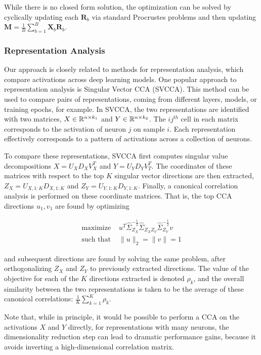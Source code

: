 While there is no closed form solution, the optimization can be solved by cyclically updating each $\mathbf{R}_{b}$ via standard Procrustes problems and then updating $\mathbf{M} = \frac{1}{B} \sum_{b = 1}^{B} \mathbf{X}_{b} \mathbf{R}_{b}$.

\subsubsection{Representation Analysis}

Our approach is closely related to methods for representation analysis, which
compare activations across deep learning models. One popular approach to
representation analysis is Singular Vector CCA (SVCCA). This method can be used
to compare pairs of representations, coming from different layers, models, or
training epochs, for example. In SVCCA, the two representations are identified
with two matrices, $X \in \mathbb{R}^{n \times k_{1}}$ and $Y \in \mathbb{R}^{n \times
  k_{2}}$. The $ij^{th}$ cell in each matrix corresponds to the activation of
neuron $j$ on sample $i$. Each representation effectively corresponds to a
pattern of activations across a collection of neurons.

To compare these representations, SVCCA first computes singular value
decompositions $X = U_{X}D_{X}V_{X}^{T}$ and $Y = U_{Y}D_{Y}V_{T}^{T}$. The
coordinates of these matrices with respect to the top $K$ singular vector
directions are then extracted, $Z_{X} = U_{X, 1:K}D_{X, 1:K}$ and $Z_{Y} = U_{Y,
  1:K}D_{Y, 1:K}$. Finally, a canonical correlation analysis is performed on
these coordinate matrices. That is, the top CCA directions $u_{1}, v_{1}$ are
found by optimizing

\begin{align*}
  \text{maximize }& u^{T}\hat{\Sigma}_{Z_{X}}^{-\frac{1}{2}}\hat{\Sigma}_{Z_{X}Z_{Y}}\hat{\Sigma}_{Z_{Y}}^{-\frac{1}{2}}v \\
  \text{such that } & \|u\|_{2} = \|v\| = 1
\end{align*}

and subsequent directions are found by solving the same problem, after
orthogonalizing $Z_{X}$ and $Z_{Y}$ to previously extracted directions. The
value of the objective for each of the $K$ directions extracted is denoted
$\rho_{k}$, and the overall similarity between the two representations is taken
to be the average of these canonical correlations: $\frac{1}{K}\sum_{k = 1}^{K}
\rho_{k}$.

Note that, while in principle, it would be possible to perform a CCA on the
activations $X$ and $Y$ directly, for representations with many neurons, the
dimensionality reduction step can lead to dramatic performance gains, because it
avoids inverting a high-dimensional correlation matrix.

